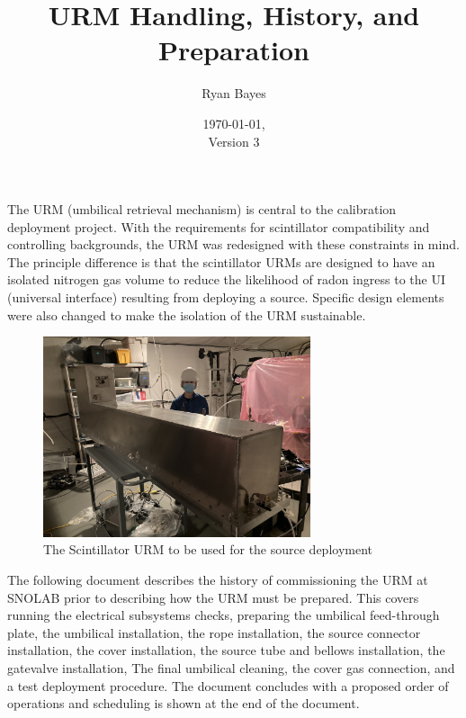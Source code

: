 \documentclass[11pt]{article}
\title{URM Handling, History, and Preparation}
\author{Ryan Bayes}
\date{\today,\\ Version 3}
\begin{document}
\maketitle

The URM (umbilical retrieval mechanism) is central to the calibration deployment project. With the requirements for scintillator compatibility and controlling backgrounds, the URM was redesigned with these constraints in mind. The principle difference is that the scintillator URMs are designed to have an isolated nitrogen gas volume to reduce the likelihood of radon ingress to the UI (universal interface) resulting from deploying a source. Specific design elements were also changed to make the isolation of the URM sustainable.

\begin{figure}
  \begin{center}
    \includegraphics[width=0.7\textwidth]{Figures/20210712_190720132_iOS}
  \end{center}
  \caption{The Scintillator URM to be used for the source deployment}
  \label{fig:URM4}
\end{figure}

The following document describes the history of commissioning the URM at SNOLAB prior to describing how the URM must be prepared. This covers running the electrical subsystems checks, preparing the umbilical feed-through plate, the umbilical installation, the rope installation, the source connector installation, the cover installation, the source tube and bellows installation, the gatevalve installation, The final umbilical cleaning, the cover gas connection, and a test deployment procedure. The document concludes with a proposed order of operations and scheduling is shown at the end of the document.
\end{document}
